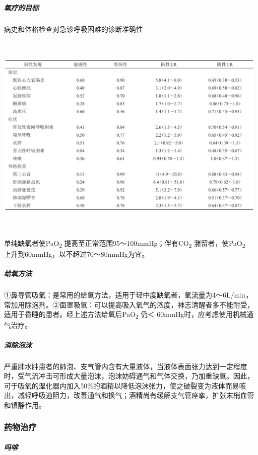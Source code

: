 \subparagraph{氧疗的目标}

\begin{table}[htbp]
\centering
\caption{病史和体格检查对急诊呼吸困难的诊断准确性}
\label{tab26-4}
\includegraphics[width=6.51042in,height=3.94792in]{./images/Image00096.jpg}
\end{table}

单纯缺氧者使PaO\textsubscript{2}
提高至正常范围95～100mmHg；伴有CO\textsubscript{2}
潴留者，使PaO\textsubscript{2} 上升到60mmHg，以不超过70～80mmHg为宜。

\subparagraph{给氧方法}

①鼻导管吸氧：是常用的给氧方法，适用于轻中度缺氧者，氧流量为4～6L/min，常加用除泡剂。②面罩吸氧：可以提高吸入氧气的浓度，神志清醒者多不能耐受，适用于昏睡的患者。经上述方法给氧后PaO\textsubscript{2}
仍＜ 60mmHg时，应考虑使用机械通气治疗。

\subparagraph{消除泡沫}

严重肺水肿患者的肺泡、支气管内含有大量液体，当液体表面张力达到一定程度时，受气流冲击可形成大量泡沫，泡沫妨碍通气和气体交换，乃加重缺氧。因此，可于吸氧的湿化器内加入50\%的酒精以降低泡沫张力，使之破裂变为液体而易咳出，减轻呼吸道阻力，改善通气和换气；酒精尚有缓解支气管痉挛，扩张末梢血管和镇静作用。

\subsubsection{药物治疗}

\subparagraph{吗啡}

